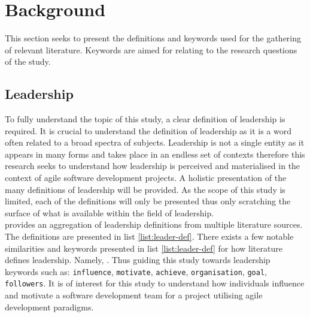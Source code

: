 \iffalse  \fi
\chapter{Background}

This section seeks to present the definitions and keywords used for the gathering of relevant literature. Keywords are aimed for relating to the research questions of the study.

\section{Leadership}

To fully understand the topic of this study, a clear definition of leadership is required. It is crucial to understand the definition of leadership as it is a word often related to a broad spectra of subjects. Leadership is not a single entity as it appears in many forms and takes place in an endless set of contexts therefore this research seeks to understand how leadership is perceived and materialised in the context of agile software development projects. A holistic presentation of the many definitions of leadership will be provided. As the scope of this study is limited, each of the definitions will only be presented thus only scratching the surface of what is available within the field of leadership.\\

\cite{book:441137} provides an aggregation of leadership definitions from multiple literature sources. The definitions are presented in list \ref{list:leader-def}. There exists a few notable similarities and keywords presented in list \ref{list:leader-def} for how literature defines leadership. Namely, \textit{}. Thus guiding this study towards leadership keywords such as: \texttt{influence}, \texttt{motivate}, \texttt{achieve}, \texttt{organisation}, \texttt{goal}, \texttt{followers}. It is of interest for this study to understand how individuals influence and motivate a software development team for a project utilising agile development paradigms.\\

